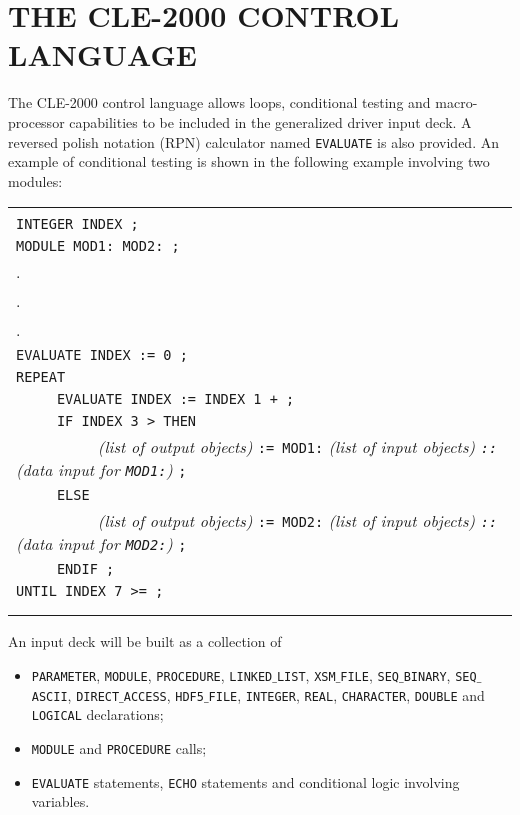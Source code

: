 \section{THE CLE-2000 CONTROL LANGUAGE}

The CLE-2000 control language allows  loops, conditional testing and
macro-processor capabilities to be included in the generalized driver input
deck. A reversed polish notation (RPN) calculator named {\tt EVALUATE} is also
provided. An example of conditional testing is shown in the following example
involving two modules:

\vskip 0.4cm

\noindent\begin{tabular}{|l|}
\hline \\
{\tt INTEGER INDEX ;} \\
{\tt MODULE MOD1: MOD2: ;} \\
. \\
. \\
. \\
{\tt EVALUATE INDEX := 0 ;} \\
{\tt REPEAT} \\
{\tt ~~~~~EVALUATE INDEX := INDEX 1 + ;} \\
{\tt ~~~~~IF INDEX 3 > THEN} \\
{\tt ~~~~~~~~~~}{\sl (list of output objects)} {\tt := MOD1:} {\sl (list of input objects) {\tt ::} (data input for {\tt MOD1:})} {\tt ; }\\
{\tt ~~~~~ELSE} \\
{\tt ~~~~~~~~~~}{\sl (list of output objects)} {\tt := MOD2:} {\sl (list of input objects) {\tt ::} (data input for {\tt MOD2:})} {\tt ;} \\
{\tt ~~~~~ENDIF ;} \\
{\tt UNTIL INDEX 7 >= ;} \\
\\ \\ \hline
\end{tabular}

\vskip 0.4cm

An input deck will be built as a collection of 
\begin{itemize}
\item {\tt PARAMETER}, {\tt MODULE}, {\tt PROCEDURE}, {\tt LINKED}$\_${\tt LIST}, {\tt XSM}$\_${\tt FILE}, {\tt SEQ}$\_${\tt BINARY}, {\tt SEQ}$\_${\tt ASCII},
{\tt DIRECT}$\_${\tt ACCESS}, {\tt HDF5}$\_${\tt FILE}, {\tt INTEGER}, {\tt REAL}, {\tt CHARACTER}, {\tt DOUBLE} and {\tt LOGICAL} declarations;
\item {\tt MODULE} and {\tt PROCEDURE} calls;
\item {\tt EVALUATE} statements, {\tt ECHO} statements and conditional logic involving variables.
\end{itemize}

